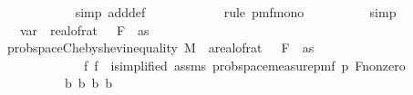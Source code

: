 \begin{isabellebody}
\ \ \ \ \ \ \ \ \ \ \isamarkupfalse%
\ {\isacharparenleft}{\kern0pt}simp\ add{\isacharcolon}{\kern0pt}{\isasymOmega}def{\isacharparenright}{\kern0pt}\isanewline
\ \ \ \ \ \ \ \ \ \ \isamarkupfalse%
\ {\isacharparenleft}{\kern0pt}rule\ pmf{\isacharunderscore}{\kern0pt}mono{\isacharunderscore}{\kern0pt}{}{\isacharparenright}{\kern0pt}\isanewline
\ \ \ \ \ \ \ \ \isamarkupfalse%
\ simp\ \isanewline
\ \ \ \ \ \ \isamarkupfalse%
\ \isamarkupfalse%
\ {\isachardoublequoteopen}{\isachardot}{\kern0pt}{\isachardot}{\kern0pt}{\isachardot}{\kern0pt}\ {\isasymle}\ var\ {\isacharslash}{\kern0pt}\ {\isacharparenleft}{\kern0pt}real{\isacharunderscore}{\kern0pt}of{\isacharunderscore}{\kern0pt}rat\ {\isacharparenleft}{\kern0pt}{\isasymdelta}\ {\isacharasterisk}{\kern0pt}\ F\ {}\ as{\isacharparenright}{\kern0pt}{\isacharparenright}{\kern0pt}\isanewline
\ \ \ \ \ \ \ \ \isamarkupfalse%
\ prob{\isacharunderscore}{\kern0pt}space{\isachardot}{\kern0pt}Chebyshev{\isacharunderscore}{\kern0pt}inequality{\isacharbrackleft}{\kern0pt}\ M{\isacharequal}{\kern0pt}{\isachardoublequoteopen}{\isasymOmega}\ \ a{\isacharequal}{\kern0pt}{\isachardoublequoteopen}real{\isacharunderscore}{\kern0pt}of{\isacharunderscore}{\kern0pt}rat\ {\isacharparenleft}{\kern0pt}{\isasymdelta}\ {\isacharasterisk}{\kern0pt}\ F\ {}\ as{\isacharparenright}{\kern0pt}{\isachardoublequoteclose}\isanewline
\ \ \ \ \ \ \ \ \ \ \ \ \ f{\isacharequal}{\kern0pt}{\isachardoublequoteopen}{\isasymlambda}{\isasymomega}{\isachardot}{\kern0pt}\ f{}\ {\isasymomega}\ i{\isachardoublequoteclose}{\isacharcomma}{\kern0pt}simplified{\isacharbrackright}{\kern0pt}\ assms{\isacharparenleft}{\kern0pt}{}{\isacharparenright}{\kern0pt}\ prob{\isacharunderscore}{\kern0pt}space{\isacharunderscore}{\kern0pt}measure{\isacharunderscore}{\kern0pt}pmf{\isacharbrackleft}{\kern0pt}\ p{\isacharequal}{\kern0pt}{\isachardoublequoteopen}{\isasymOmega}\ F{\isacharunderscore}{\kern0pt}{}{\isacharunderscore}{\kern0pt}nonzero\isanewline
\ \ \ \ \ \ \ \ \ \ b{\isacharunderscore}{\kern0pt}{}\ b{\isacharunderscore}{\kern0pt}{}\ b{\isacharunderscore}{\kern0pt}{}\ b{\isacharunderscore}{\kern0pt}{}\ \isamarkupfalse%

\end{isabellebody}
